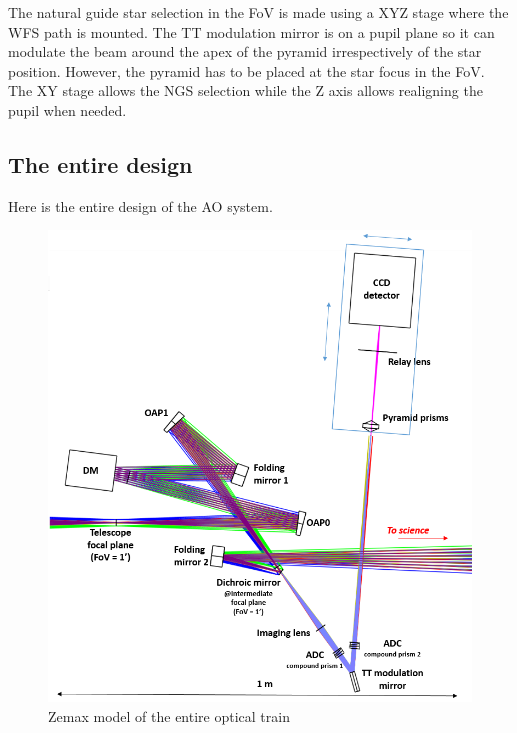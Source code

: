 \documentclass[12pt,a4paper]{article}
\begin{document}
The natural guide star selection in the FoV is made using a XYZ stage where the WFS path is mounted. The TT modulation mirror is on a pupil plane so it can modulate the beam around the apex of the pyramid irrespectively of the star position. However, the pyramid has to be placed at the star focus in the FoV. The XY stage allows the NGS selection while the Z axis allows realigning the pupil when needed.

\subsection{The entire design}
Here is the entire design of the AO system.
\begin{figure}[H]
	\begin{center}
		\includegraphics[width=\textwidth]{images/Entire_Design.PNG}
		\caption{Zemax model of the entire optical train}\label{fig:Entire_Design}
	\end{center}
\end{figure}
\end{document}
